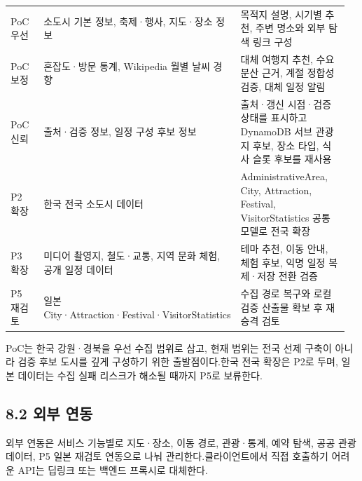 \documentclass[12pt,a4paper]{article}
\newcommand{\DocNeedspace}[1]{\par\ifdim\dimexpr\pagegoal-\pagetotal\relax<#1\newpage\fi}
\renewcommand{\arraystretch}{1.35}
\begin{document}
\DocNeedspace{18\baselineskip}
\begin{small}
\setlength{\tabcolsep}{3pt}
\setlength{\extrarowheight}{1pt}
\renewcommand{\arraystretch}{1.42}
\begin{longtable}{@{}>{\centering\arraybackslash}m{0.157\linewidth}>{\RaggedRight\arraybackslash}m{0.352\linewidth}>{\RaggedRight\arraybackslash}m{0.450\linewidth}@{}}
\toprule
\multicolumn{1}{>{\centering\arraybackslash}m{0.157\linewidth}}{\textbf{구분}} & \multicolumn{1}{>{\centering\arraybackslash}m{0.352\linewidth}}{\textbf{데이터 범위}} & \multicolumn{1}{>{\centering\arraybackslash}m{0.450\linewidth}}{\textbf{활용 기준}} \\
\midrule
\endhead
PoC 우선 & 소도시 기본 정보, 축제·행사, 지도·장소 정보 & 목적지 설명, 시기별 추천, 주변 명소와 외부 탐색 링크 구성 \\
PoC 보정 & 혼잡도·방문 통계, Wikipedia 월별 날씨 경향 & 대체 여행지 추천, 수요 분산 근거, 계절 정합성 검증, 대체 일정 알림 \\
PoC 신뢰 & 출처·검증 정보, 일정 구성 후보 정보 & 출처·갱신 시점·검증 상태를 표시하고 DynamoDB 서브 관광지 후보, 장소 타입, 식사 슬롯 후보를 재사용 \\
P2 확장 & 한국 전국 소도시 데이터 & AdministrativeArea, City, Attraction, Festival, VisitorStatistics 공통 모델로 전국 확장 \\
P3 확장 & 미디어 촬영지, 철도·교통, 지역 문화 체험, 공개 일정 데이터 & 테마 추천, 이동 안내, 체험 후보, 익명 일정 복제·저장 전환 검증 \\
P5 재검토 & 일본 City·Attraction·Festival·VisitorStatistics & 수집 경로 복구와 로컬 검증 산출물 확보 후 재승격 검토 \\
\bottomrule
\end{longtable}
\end{small}


\DocNeedspace{3\baselineskip}
PoC는 한국 강원·경북을 우선 수집 범위로 삼고, 현재 범위는 전국 선제 구축이 아니라 검증 후보 도시를 깊게 구성하기 위한 출발점이다.\newline 한국 전국 확장은 P2로 두며, 일본 데이터는 수집 실패 리스크가 해소될 때까지 P5로 보류한다.


\DocNeedspace{24\baselineskip}
\subsection*{8.2 외부 연동}


\DocNeedspace{3\baselineskip}
외부 연동은 서비스 기능별로 지도·장소, 이동 경로, 관광·통계, 예약 탐색, 공공 관광 데이터, P5 일본 재검토 연동으로 나눠 관리한다.\newline 클라이언트에서 직접 호출하기 어려운 API는 딥링크 또는 백엔드 프록시로 대체한다.
\end{document}

